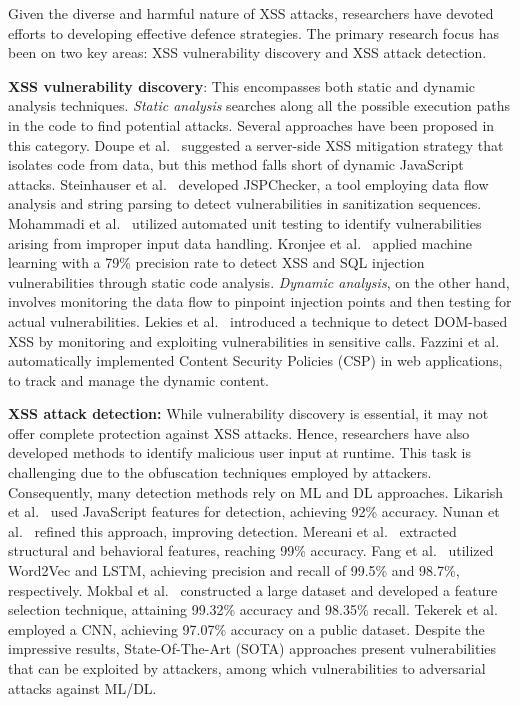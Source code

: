 Given the diverse and harmful nature of XSS attacks, researchers have devoted efforts to developing effective defence strategies. The primary research focus has been on two key areas: XSS vulnerability discovery and XSS attack detection. 

\textbf{XSS vulnerability discovery}: This encompasses both static and dynamic analysis techniques. \textit{Static analysis} searches along all the possible execution paths in the code to find potential attacks. Several approaches have been proposed in this category. Doupe et al.~\cite{doupe2013dedacota} suggested a server-side XSS mitigation strategy that isolates code from data, but this method falls short of dynamic JavaScript attacks. Steinhauser et al.~\cite{steinhauser2016static} developed JSPChecker, a tool employing data flow analysis and string parsing to detect vulnerabilities in sanitization sequences. Mohammadi et al.~\cite{mohammadi2017detecting} utilized automated unit testing to identify vulnerabilities arising from improper input data handling. Kronjee et al.~\cite{kronjee2018discovering} applied machine learning with a 79\% precision rate to detect XSS and SQL injection vulnerabilities through static code analysis. \textit{Dynamic analysis}, on the other hand, involves monitoring the data flow to pinpoint injection points and then testing for actual vulnerabilities. Lekies et al.~\cite{lekies2013detection} introduced a technique to detect DOM-based XSS by monitoring and exploiting vulnerabilities in sensitive calls. Fazzini et al.~\cite{fazzini2015automatically} automatically implemented Content Security Policies (CSP) in web applications, to track and manage the dynamic content.

\textbf{XSS attack detection:} While vulnerability discovery is essential, it may not offer complete protection against XSS attacks. Hence, researchers have also developed methods to identify malicious user input at runtime. This task is challenging due to the obfuscation techniques employed by attackers. Consequently, many detection methods rely on ML and DL approaches. Likarish et al.~\cite{likarish2009obfuscated} used JavaScript features for detection, achieving 92\% accuracy. Nunan et al.~\cite{nunan2012automatic} refined this approach, improving detection. Mereani et al.~\cite{mereani2018howe} extracted structural and behavioral features, reaching 99\% accuracy. Fang et al.~\cite{fang2018deepxss} utilized Word2Vec and LSTM, achieving precision and recall of 99.5\% and 98.7\%, respectively. Mokbal et al.~\cite{mokbal2019mlpxss} constructed a large dataset and developed a feature selection technique, attaining 99.32\% accuracy and 98.35\% recall. Tekerek et al.~\cite{tekerek2021novel} employed a CNN, achieving 97.07\% accuracy on a public dataset.
Despite the impressive results, State-Of-The-Art (SOTA) approaches present  vulnerabilities that can be exploited by attackers, among which  vulnerabilities to adversarial attacks against ML/DL.


